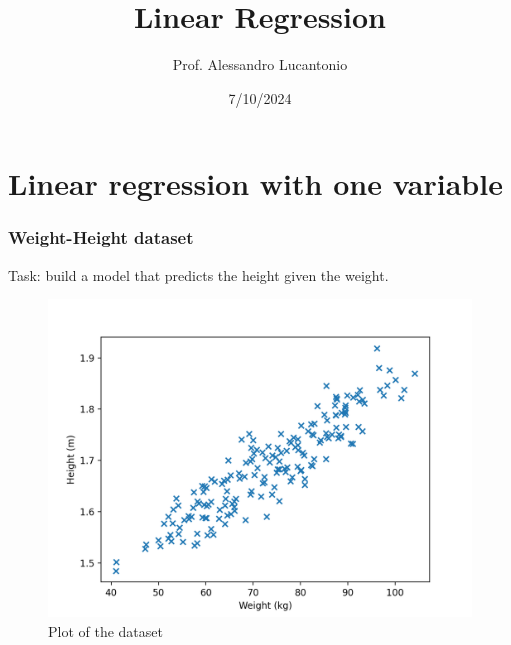 \documentclass{beamer}
\title{Linear Regression}
\author{Prof. Alessandro Lucantonio}
\institute{Aarhus University}
\date{7/10/2024}
\begin{document}
	
	\frame{\titlepage}
	
	\section{Linear regression with one variable}

	\begin{frame}
		\frametitle{Weight-Height dataset}
		
		Task: build a model that predicts the height given the weight. 
		
		\begin{figure}
			\centering
			\includegraphics[scale=0.5]{images/linear_regression_data}
			\caption{Plot of the dataset}
		\end{figure}
	\end{frame}
\end{document}
